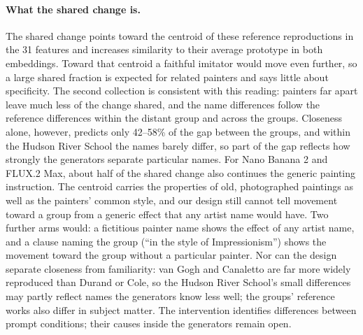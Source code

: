 \documentclass[10pt]{article}
\begin{document}
\paragraph{What the shared change is.}
The shared change points toward the centroid of these reference reproductions in the 31 features
and increases similarity to their average prototype in both embeddings. Toward that centroid a
faithful imitator would move even further, so a large shared fraction is expected for related
painters and says little about specificity. The second collection is consistent with this reading:
painters far apart leave much less of the change shared, and the name differences follow the
reference differences within the distant group and across the groups. Closeness alone, however,
predicts only 42--58\% of the gap between the groups, and within the Hudson River School the names
barely differ, so part of the gap reflects how strongly the generators separate particular names.
For Nano Banana 2 and FLUX.2 Max, about half of the shared change also
continues the generic painting instruction. The centroid carries the properties of old,
photographed paintings as well as the painters' common style, and our design still cannot tell
movement toward a group from a generic effect that any artist name would have. Two further arms
would: a fictitious painter name shows the effect of any artist name, and a clause naming the group
(``in the style of Impressionism'') shows the movement toward the group without a particular
painter. Nor can the design separate closeness from familiarity: van Gogh and Canaletto are far
more widely reproduced than Durand or Cole, so the Hudson River School's small differences may
partly reflect names the generators know less well; the groups' reference works also differ in
subject matter.
The intervention identifies differences between prompt conditions; their causes inside the
generators remain open.
\end{document}
